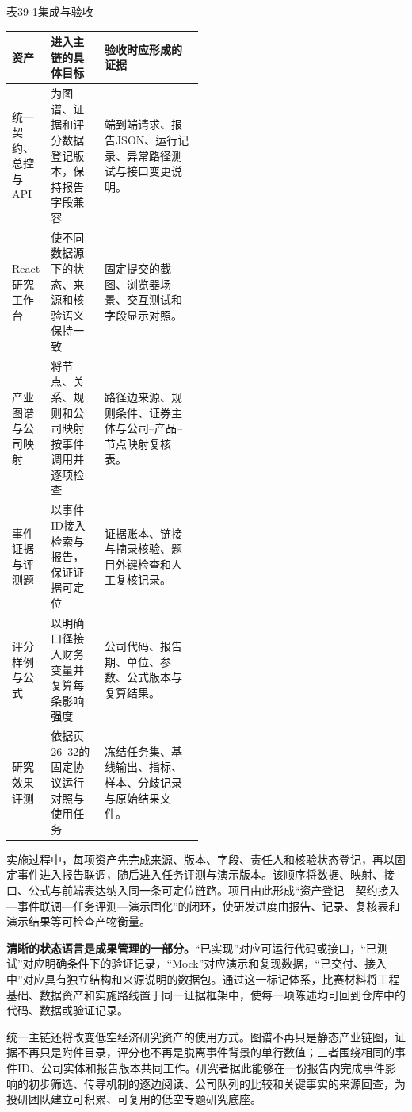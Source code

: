 \begin{center}\small 表39-1\quad 集成与验收\par\vspace{1mm}
\begin{tabularx}{\linewidth}{p{0.20\linewidth}p{0.28\linewidth}X}
\toprule
资产 & 进入主链的具体目标 & 验收时应形成的证据\\
\midrule
统一契约、总控与API & 为图谱、证据和评分数据登记版本，保持报告字段兼容 & 端到端请求、报告JSON、运行记录、异常路径测试与接口变更说明。\\
React研究工作台 & 使不同数据源下的状态、来源和核验语义保持一致 & 固定提交的截图、浏览器场景、交互测试和字段显示对照。\\
产业图谱与公司映射 & 将节点、关系、规则和公司映射按事件调用并逐项检查 & 路径边来源、规则条件、证券主体与公司--产品--节点映射复核表。\\
事件证据与评测题 & 以事件ID接入检索与报告，保证证据可定位 & 证据账本、链接与摘录核验、题目外键检查和人工复核记录。\\
评分样例与公式 & 以明确口径接入财务变量并复算每条影响强度 & 公司代码、报告期、单位、参数、公式版本与复算结果。\\
研究效果评测 & 依据页26--32的固定协议运行对照与使用任务 & 冻结任务集、基线输出、指标、样本、分歧记录与原始结果文件。\\
\bottomrule
\end{tabularx}\end{center}

实施过程中，每项资产先完成来源、版本、字段、责任人和核验状态登记，再以固定事件进入报告联调，随后进入任务评测与演示版本。该顺序将数据、映射、接口、公式与前端表达纳入同一条可定位链路。项目由此形成“资产登记—契约接入—事件联调—任务评测—演示固化”的闭环，使研发进度由报告、记录、复核表和演示结果等可检查产物衡量。

\noindent\textbf{清晰的状态语言是成果管理的一部分。}“已实现”对应可运行代码或接口，“已测试”对应明确条件下的验证记录，“Mock”对应演示和复现数据，“已交付、接入中”对应具有独立结构和来源说明的数据包。通过这一标记体系，比赛材料将工程基础、数据资产和实施路线置于同一证据框架中，使每一项陈述均可回到仓库中的代码、数据或验证记录\cite{lhy-repository,lhy-architecture}。

统一主链还将改变低空经济研究资产的使用方式。图谱不再只是静态产业链图，证据不再只是附件目录，评分也不再是脱离事件背景的单行数值；三者围绕相同的事件ID、公司实体和报告版本共同工作。研究者据此能够在一份报告内完成事件影响的初步筛选、传导机制的逐边阅读、公司队列的比较和关键事实的来源回查，为投研团队建立可积累、可复用的低空专题研究底座。

